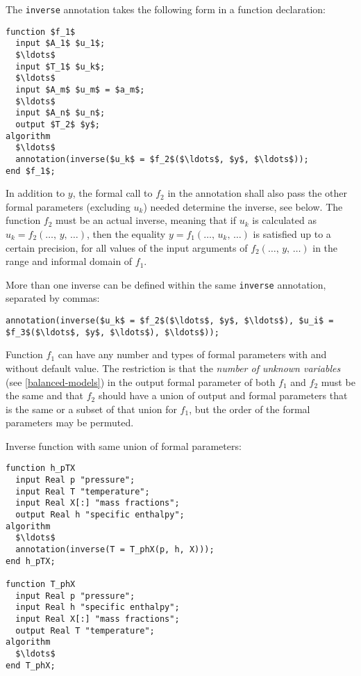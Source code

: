 The {\lstinline!inverse!} annotation takes the following form in a function declaration:
\begin{lstlisting}[language=modelica]
function $f_1$
  input $A_1$ $u_1$;
  $\ldots$
  input $T_1$ $u_k$;
  $\ldots$
  input $A_m$ $u_m$ = $a_m$;
  $\ldots$
  input $A_n$ $u_n$;
  output $T_2$ $y$;
algorithm
  $\ldots$
  annotation(inverse($u_k$ = $f_2$($\ldots$, $y$, $\ldots$));
end $f_1$;
\end{lstlisting}

In addition to $y$, the formal call to $f_2$ in the annotation shall also pass the other formal parameters (excluding $u_{k}$) needed determine the inverse, see below.
The function $f_2$ must be an actual inverse, meaning that if $u_k$ is calculated as $u_k = f_2(\ldots,\, y,\, \ldots)$, then the equality $y = f_1(\ldots,\, u_k,\, \ldots)$ is satisfied up to a certain precision, for all values of the input arguments of $f_2(\ldots,\, y,\, \ldots)$ in the range and informal domain of $f_1$.

More than one inverse can be defined within the same {\lstinline!inverse!} annotation, separated by commas:
\begin{lstlisting}[language=modelica]
annotation(inverse($u_k$ = $f_2$($\ldots$, $y$, $\ldots$), $u_i$ = $f_3$($\ldots$, $y$, $\ldots$), $\ldots$));
\end{lstlisting}

Function $f_1$ can have any number and types of formal parameters with and without default value.
The restriction is that the \emph{number of unknown variables} (see \cref{balanced-models}) in the output formal parameter of both $f_1$ and $f_2$ must be the same and that $f_2$ should have a union of output and formal parameters that is the same or a subset of that union for $f_1$, but the order of the formal parameters may be permuted.

\begin{example}
Inverse function with same union of formal parameters:
\begin{lstlisting}[language=modelica]
function h_pTX
  input Real p "pressure";
  input Real T "temperature";
  input Real X[:] "mass fractions";
  output Real h "specific enthalpy";
algorithm
  $\ldots$
  annotation(inverse(T = T_phX(p, h, X)));
end h_pTX;

function T_phX
  input Real p "pressure";
  input Real h "specific enthalpy";
  input Real X[:] "mass fractions";
  output Real T "temperature";
algorithm
  $\ldots$
end T_phX;
\end{lstlisting}
\end{example}

